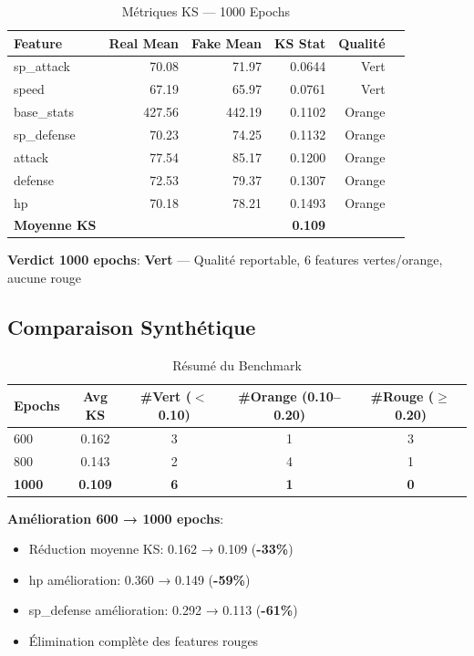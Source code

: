 \documentclass[11pt,a4paper]{article}
\begin{document}
\begin{table}[H]
\centering
\caption{Métriques KS — 1000 Epochs}
\small
\begin{tabular}{lrrrrr}
\toprule
\textbf{Feature} & \textbf{Real Mean} & \textbf{Fake Mean} & \textbf{KS Stat} & \textbf{Qualité} \\
\midrule
sp\_attack & 70.08 & 71.97 & 0.0644 & \cellcolor{green!20}Vert \\
speed & 67.19 & 65.97 & 0.0761 & \cellcolor{green!20}Vert \\
base\_stats & 427.56 & 442.19 & 0.1102 & \cellcolor{yellow!30}Orange \\
sp\_defense & 70.23 & 74.25 & 0.1132 & \cellcolor{yellow!30}Orange \\
attack & 77.54 & 85.17 & 0.1200 & \cellcolor{yellow!30}Orange \\
defense & 72.53 & 79.37 & 0.1307 & \cellcolor{yellow!30}Orange \\
hp & 70.18 & 78.21 & 0.1493 & \cellcolor{yellow!30}Orange \\
\midrule
\textbf{Moyenne KS} & & & \textbf{0.109} & \\
\bottomrule
\end{tabular}
\end{table}

\textbf{Verdict 1000 epochs}:  \textbf{Vert} — Qualité reportable, 6 features vertes/orange, aucune rouge

\subsection{Comparaison Synthétique}

\begin{table}[H]
\centering
\caption{Résumé du Benchmark}
\begin{tabular}{lcccc}
\toprule
\textbf{Epochs} & \textbf{Avg KS} & \textbf{\#Vert} ($<$0.10) & \textbf{\#Orange} (0.10--0.20) & \textbf{\#Rouge} ($\geq$0.20) \\
\midrule
600 & 0.162 & 3 & 1 & 3 \\
800 & 0.143 & 2 & 4 & 1 \\
\textbf{1000} & \textbf{0.109} & \textbf{6} & \textbf{1} & \textbf{0} \\
\bottomrule
\end{tabular}
\end{table}

\textbf{Amélioration 600 → 1000 epochs}:
\begin{itemize}
    \item Réduction moyenne KS: 0.162 → 0.109 (\textbf{-33\%})
    \item hp amélioration: 0.360 → 0.149 (\textbf{-59\%})
    \item sp\_defense amélioration: 0.292 → 0.113 (\textbf{-61\%})
    \item Élimination complète des features rouges
\end{itemize}
\end{document}
